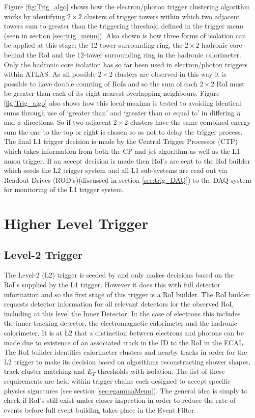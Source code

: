 	Figure \ref{fig:Trig_algo} shows how the electron/photon trigger clustering algorithm works by identifying $2 \times 2$ clusters of trigger towers within which two adjacent towers sum to greater than the triggering threshold defined in the trigger menu (seen in section \ref{sec:trig_menu}). Also shown is how three forms of isolation can be applied at this stage: the 12-tower surrounding ring, the $2 \times 2$ hadronic core behind the RoI and the 12-tower surrounding ring in the hadronic calorimeter. Only the hadronic core isolation has so far been used in electron/photon triggers within ATLAS. 
	As all possible $2 \times 2$ clusters are observed in this way it is possible to have double counting of RoIs and so the sum of each $2 \times 2$ RoI must be greater than each of its eight nearest overlapping neighbours. Figure \ref{fig:Trig_algo} also shows how this local-maxima is tested to avoiding identical sums through use of `greater than' and `greater than or equal to' in differing $\eta$ and $\phi$ directions. So if two adjacent $2 \times 2$ clusters have the same combined energy sum the one to the top or right is chosen so as not to delay the trigger process.
	The final L1 trigger decision is made by the Central Trigger Processor (CTP) which takes information from both the CP and jet algorithm as well as the L1 muon trigger. If an accept decision is made then RoI's are sent to the RoI builder which seeds the L2 trigger system and all L1 sub-systems are read out via Readout Drives (ROD's)(discussed in section \ref{sec:trig_DAQ}) to the DAQ system for monitoring of the L1 trigger system.



\section{Higher Level Trigger}

	\subsection*{Level-2 Trigger}

		The Level-2 (L2) trigger is seeded by and only makes decisions based on the RoI's supplied by the L1 trigger. However it does this with full detector information and so the first stage of this trigger is a RoI builder. The RoI builder requests detector information for all relevant detectors for the observed RoI, including at this level the Inner Detector. In the case of electrons this includes the inner tracking detector, the electromagnetic calorimeter and the hadronic calorimeter. It is at L2 that a distinction between electrons and photons can be made due to existence of an associated track in the ID to the RoI in the ECAL. The RoI builder identifies calorimeter clusters and nearby tracks in order for the L2 trigger to make its decision based on algorithms reconstructing shower shapes, track-cluster matching and $E_{T}$ thresholds with isolation. The list of these requirements are held within trigger chains each designed to accept specific physics signatures (see section \ref{sec:egammaMenu}). The general idea is simply to check if RoI's still exist under closer inspection in order to reduce the rate of events before full event building takes place in the Event Filter.


